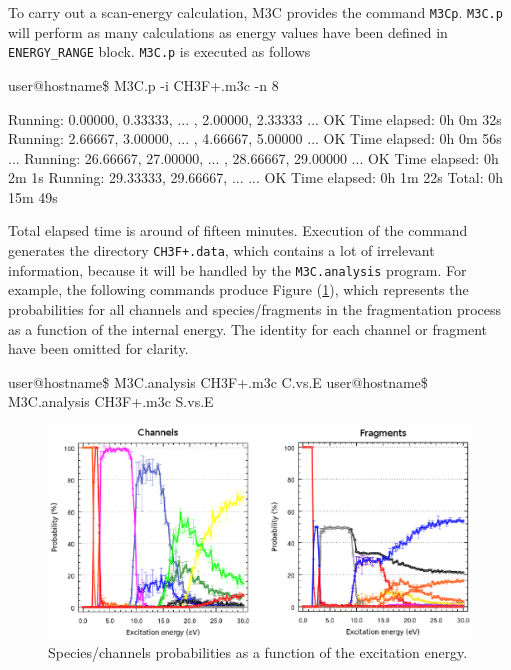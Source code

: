 \documentclass[a4paper,12pt]{article}
\begin{document}
To carry out a scan-energy calculation, M3C provides the command \texttt{M3Cp}. \texttt{M3C.p} will perform as many calculations as energy values have been defined 
in \texttt{ENERGY\_RANGE} block. \texttt{M3C.p} is executed as follows

\begin{shellexec}
user@hostname\$ M3C.p -i CH3F+.m3c -n 8

Running:    0.00000,   0.33333,  ... ,   2.00000,   2.33333 ... OK     Time elapsed: 0h  0m 32s
Running:    2.66667,   3.00000,  ... ,   4.66667,   5.00000 ... OK     Time elapsed: 0h  0m 56s
...
Running:   26.66667,  27.00000,  ... ,  28.66667,  29.00000 ... OK     Time elapsed: 0h  2m  1s
Running:   29.33333,  29.66667,  ...                        ... OK     Time elapsed: 0h  1m 22s
                                                                              Total: 0h 15m 49s
\end{shellexec}
Total elapsed time is around of fifteen minutes. Execution of the command generates the directory \texttt{CH3F+.data}, which contains a lot of
irrelevant information, because it will be handled by the \texttt{M3C.analysis} program. For example, the following commands produce
Figure (\ref{fig: breakdown curves}), which represents the probabilities for all channels and species/fragments in the fragmentation process as a function of the internal energy.
The identity for each channel or fragment have been omitted for clarity.

\begin{shellexec}
user@hostname\$ M3C.analysis CH3F+.m3c C.vs.E
user@hostname\$ M3C.analysis CH3F+.m3c S.vs.E
\end{shellexec}


\begin{figure}[h]
\centering
\includegraphics[scale=0.7]{images/breakdownCurves.eps}
\caption{\footnotesize{
Species/channels probabilities as a function of the excitation energy.
}}
\label{fig: breakdown curves}
\end{figure}
\end{document}
